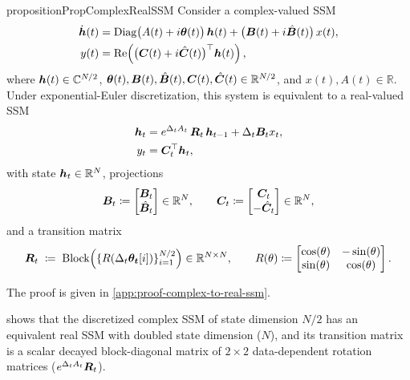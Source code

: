 \begin{restatable}{proposition}{PropComplexRealSSM}\label{prop:complex-to-real-ssm}
Consider a complex-valued SSM
\begin{align}
\label{eq:complex-ssm}
    \dot{{\bm{h}}}(t) &= \mathrm{Diag}\big(A(t) + i \boldsymbol{\theta}(t)\big)\,{\bm{h}}(t) 
    + \big({\bm{B}}(t) + i\hat{{\bm{B}}}(t)\big)\,x(t), \\ \nonumber
    y(t) &= \mathrm{Re}\!\left(
        \big({\bm{C}}(t) + i\hat{{\bm{C}}}(t)\big)^{\top}{\bm{h}}(t)
    \right),
\end{align}
where ${\bm{h}}(t) \in \mathbb{C}^{N/2}$, $\boldsymbol{\theta}(t),{\bm{B}}(t),\hat{{\bm{B}}}(t),{\bm{C}}(t),\hat{{\bm{C}}}(t)\in\mathbb{R}^{N/2}$, and $x(t),A(t)\in\mathbb{R}$.
Under exponential-Euler discretization, this system is equivalent to a real-valued SSM
\begin{align}
\label{eq:real-ssm}
    {\bm{h}}_t &= e^{\Delta_t A_t}\,{\bm{R}}_t\,{\bm{h}}_{t-1} + \Delta_t {\bm{B}}_t x_t, \\  \nonumber
    y_t   &= {\bm{C}}_t^{\top}{\bm{h}}_t,
\end{align}
with state ${\bm{h}}_t \in \mathbb{R}^N$, projections 
\[
{\bm{B}}_t \coloneqq \begin{bmatrix} {\bm{B}}_t \\ \hat{{\bm{B}}}_t \end{bmatrix} \in \mathbb{R}^N, 
\qquad 
{\bm{C}}_t \coloneqq \begin{bmatrix} {\bm{C}}_t \\ -\hat{{\bm{C}}}_t \end{bmatrix} \in \mathbb{R}^N, 
\]
and a transition matrix 
\[
{\bm{R}}_t \;\coloneqq\; \text{Block}\Big(\{R(\Delta_t \boldsymbol{\theta_t}[i])\}_{i=1}^{N/2}\Big)
\in \mathbb{R}^{N \times N}
,
\qquad 
R(\theta) \coloneqq 
\begin{bmatrix}
    \cos(\theta) & -\sin(\theta) \\
    \sin(\theta) & \cos(\theta)
\end{bmatrix}.
\]
\end{restatable}

The proof is given in \cref{app:proof-complex-to-real-ssm}. 

 shows that the discretized complex SSM of state dimension $N/2$ has an equivalent real SSM with doubled state dimension ($N$), and its transition matrix is a scalar decayed block-diagonal matrix of $2\times2$ data-dependent rotation matrices ($e^{\Delta_t A_t} {\bm{R}}_t$).

